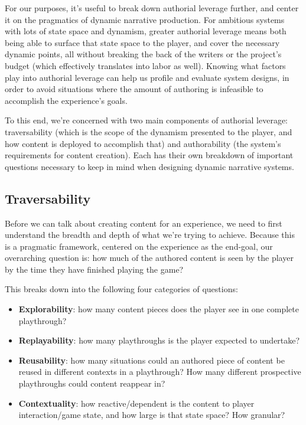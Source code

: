 For our purposes, it's useful to break down authorial leverage further, and center it on the pragmatics of dynamic narrative production. For ambitious systems with lots of state space and dynamism, greater authorial leverage means both being able to surface that state space to the player, and cover the necessary dynamic points, all without breaking the back of the writers or the project's budget (which effectively translates into labor as well). Knowing what factors play into authorial leverage can help us profile and evaluate system designs, in order to avoid situations where the amount of authoring is infeasible to accomplish the experience's goals.

To this end, we're concerned with two main components of authorial leverage: traversability (which is the scope of the dynamism presented to the player, and how content is deployed to accomplish that) and authorability (the system's requirements for content creation). Each has their own breakdown of important questions necessary to keep in mind when designing dynamic narrative systems.

\subsection{Traversability}

Before we can talk about creating content for an experience, we need to first understand the breadth and depth of what we're trying to achieve. Because this is a pragmatic framework, centered on the experience as the end-goal, our overarching question is: how much of the authored content is seen by the player by the time they have finished playing the game? 

This breaks down into the following four categories of questions:

\begin{itemize}
	\item \textbf{Explorability}: how many content pieces does the player see in one complete playthrough? 
	\item \textbf{Replayability}: how many playthroughs is the player expected to undertake?
	\item \textbf{Reusability}: how many situations could an authored piece of content be reused in different contexts in a playthrough? How many different prospective playthroughs could content reappear in?
	\item \textbf{Contextuality}: how reactive/dependent is the content to player interaction/game state, and how large is that state space? How granular?
\end{itemize}

